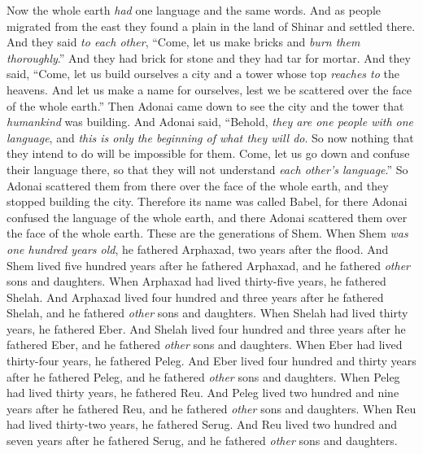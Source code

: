 \begin{biblechapter} %
 Now the whole earth \textit{had} one language and the same words.
\verse And as people migrated from the east they found a plain in the land of Shinar and settled there.
\verse And they said \textit{to each other}, “Come, let us make bricks and \textit{burn them thoroughly}.” And they had brick for stone and they had tar for mortar.
\verse And they said, “Come, let us build ourselves a city and a tower whose top \textit{reaches to} the heavens. And let us make a name for ourselves, lest we be scattered over the face of the whole earth.”
\verse Then Adonai came down to see the city and the tower that \textit{humankind} was building.
\verse And Adonai said, “Behold, \textit{they are one people with one language}, and \textit{this is only the beginning of what they will do}. So now nothing that they intend to do will be impossible for them.
\verse Come, let us go down and confuse their language there, so that they will not understand \textit{each other’s language}.”
\verse So Adonai scattered them from there over the face of the whole earth, and they stopped building the city.
\verse Therefore its name was called Babel, for there Adonai confused the language of the whole earth, and there Adonai scattered them over the face of the whole earth.
 These are the generations of Shem. When Shem \textit{was one hundred years old}, he fathered Arphaxad, two years after the flood.
\verse And Shem lived five hundred years after he fathered Arphaxad, and he fathered \textit{other} sons and daughters.
\verse When Arphaxad had lived thirty-five years, he fathered Shelah.
\verse And Arphaxad lived four hundred and three years after he fathered Shelah, and he fathered \textit{other} sons and daughters.
\verse When Shelah had lived thirty years, he fathered Eber.
\verse And Shelah lived four hundred and three years after he fathered Eber, and he fathered \textit{other} sons and daughters.
\verse When Eber had lived thirty-four years, he fathered Peleg.
\verse And Eber lived four hundred and thirty years after he fathered Peleg, and he fathered \textit{other} sons and daughters.
\verse When Peleg had lived thirty years, he fathered Reu.
\verse And Peleg lived two hundred and nine years after he fathered Reu, and he fathered \textit{other} sons and daughters.
\verse When Reu had lived thirty-two years, he fathered Serug.
\verse And Reu lived two hundred and seven years after he fathered Serug, and he fathered \textit{other} sons and daughters.

\end{biblechapter}
